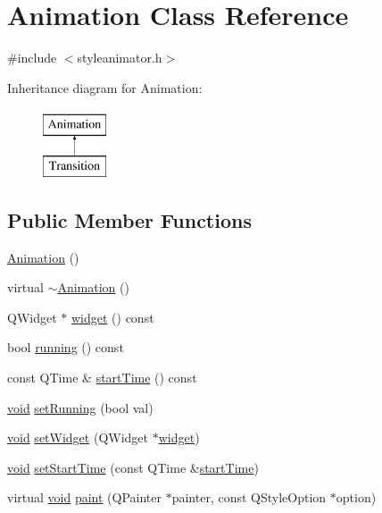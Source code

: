 \hypertarget{class_animation}{\section{Animation Class Reference}
\label{class_animation}
}


{\ttfamily \#include $<$styleanimator.\-h$>$}

Inheritance diagram for Animation\-:\begin{figure}[H]
\begin{center}
\leavevmode
\includegraphics[height=2.000000cm]{class_animation}
\end{center}
\end{figure}
\subsection*{Public Member Functions}
\begin{DoxyCompactItemize}
\item 
\hyperlink{group___core_plugin_ga83f0a16cef7117f187ad596de38dd9d6}{Animation} ()
\item 
virtual \hyperlink{group___core_plugin_gae4553ab990ad98809f27aa5445011881}{$\sim$\-Animation} ()
\item 
Q\-Widget $\ast$ \hyperlink{group___core_plugin_ga139eb8db6fd9617f4eacdcc5159492a9}{widget} () const 
\item 
bool \hyperlink{group___core_plugin_ga3261fc81ed05713dec36b68d4a86b2d9}{running} () const 
\item 
const Q\-Time \& \hyperlink{group___core_plugin_ga417bfeb8642e6da528f4237a83f1e068}{start\-Time} () const 
\item 
\hyperlink{group___u_a_v_objects_plugin_ga444cf2ff3f0ecbe028adce838d373f5c}{void} \hyperlink{group___core_plugin_ga3c2b385077e8de8beae1d09f55d735d2}{set\-Running} (bool val)
\item 
\hyperlink{group___u_a_v_objects_plugin_ga444cf2ff3f0ecbe028adce838d373f5c}{void} \hyperlink{group___core_plugin_gaecef76fa5071fa89f35232831c54d92e}{set\-Widget} (Q\-Widget $\ast$\hyperlink{group___core_plugin_ga139eb8db6fd9617f4eacdcc5159492a9}{widget})
\item 
\hyperlink{group___u_a_v_objects_plugin_ga444cf2ff3f0ecbe028adce838d373f5c}{void} \hyperlink{group___core_plugin_gaf99c302f7084539908a94b5fa4239037}{set\-Start\-Time} (const Q\-Time \&\hyperlink{group___core_plugin_ga417bfeb8642e6da528f4237a83f1e068}{start\-Time})
\item 
virtual \hyperlink{group___u_a_v_objects_plugin_ga444cf2ff3f0ecbe028adce838d373f5c}{void} \hyperlink{group___core_plugin_ga48e4128d0ce2e0f0d728d099f16d1f11}{paint} (Q\-Painter $\ast$painter, const Q\-Style\-Option $\ast$option)
\end{DoxyCompactItemize}
